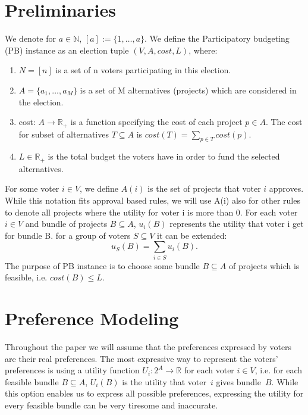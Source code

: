 \documentclass[runningheads]{llncs}
\begin{document}
\section{Preliminaries}
We denote for $a\in \mathbb{N}$,  $[a]:=\{1,\ldots,a\}$.
We define the Participatory budgeting (PB) instance as an election tuple $(V,A,cost,L)$, where:
\begin{enumerate}
    \item $N=[n]$ is a set of n voters participating in this election.
    \item $A=\{a_1,\ldots,a_M\}$ is a set of M alternatives (projects) which are considered in the election.
    \item cost: $A\rightarrow \mathbb{R}_+$ is a function specifying the cost of each project $p\in A$. The cost for subset of alternatives $T\subseteq A$ is $cost(T)=\sum_{p\in T}cost(p)$.
    \item $L\in \mathbb{R}_+$ is the total budget the voters have in order to fund the selected alternatives. 
\end{enumerate}
 
 For some voter $i\in V$, we define $A(i)$ is the set of projects that voter $i$ approves. While this notation fits approval based rules, we will use A(i) also for other rules to denote all projects where the utility for voter i is more than 0.
     For each voter $i\in V$ and bundle of projects $B\subseteq A$, $u_i(B)$ represents the utility that voter i get for bundle B. for a group of voters $S\subseteq V$ it can be extended: 
$$u_S(B)=\sum_{i\in S}u_i(B).$$
 The purpose of PB instance is to choose some bundle $B\subseteq A$ of projects which is feasible, i.e. $cost(B)\leq L$. 



\section{Preference Modeling}\label{input}


Throughout the paper we will assume that the preferences expressed by voters are their real preferences.  
The most expressive way to represent the voters' preferences is using a utility function $U_i:2^A\rightarrow \mathbb R$  for each voter $i\in V$,  i.e. for each feasible bundle $B\subseteq A$, $U_i(B)$ is the utility that voter~$i$ gives bundle~$B$. While this option enables us to express all possible preferences, expressing the utility for every feasible bundle can be very tiresome and inaccurate.
\end{document}
